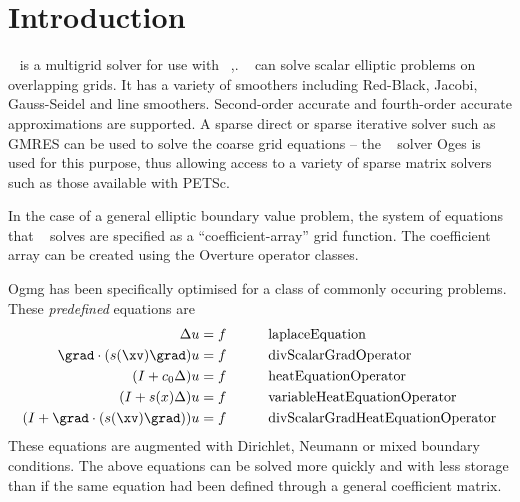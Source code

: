 \documentclass{article}
\begin{document}
\clearpage
\tableofcontents



\clearpage
\section{Introduction}

\Ogmg~ is a multigrid solver for use with \Overture~\cite{overset96},\cite{OGES}.
\Ogmg~ can solve scalar elliptic problems
on overlapping grids. It has a variety of smoothers including
Red-Black, Jacobi, Gauss-Seidel and line smoothers. Second-order accurate and fourth-order
accurate approximations are supported.
A sparse direct or sparse iterative
solver such as GMRES can be used to solve the coarse grid equations --
the \Overture~ solver Oges is used for this purpose, thus allowing access to a variety of
sparse matrix solvers such as those available with PETSc\cite{PETSc}.

In the case of a general elliptic boundary value problem, 
the system of equations that \Ogmg~ solves are specified as a ``coefficient-array''
grid function. The coefficient array can be created using the Overture operator classes. 


Ogmg has been specifically optimised for a class of commonly occuring problems. These
{\sl predefined} equations are 
\begin{alignat*}{3} \label{eq:predefined}
   \Delta u & = f &\qquad&  \mbox{laplaceEquation}  \\
   \grad\cdot( s(\xv) \grad) u & = f &\qquad&  \mbox{divScalarGradOperator} \\
   (I + c_0 \Delta) u & = f &\qquad&  \mbox{heatEquationOperator}  \\
  (I + s(x) \Delta) u & = f &\qquad&  \mbox{variableHeatEquationOperator}  \\
  (I + \grad\cdot( s(\xv) \grad)) u & = f &\qquad&  \mbox{divScalarGradHeatEquationOperator} 
\end{alignat*}
These equations are augmented with Dirichlet, Neumann or mixed boundary conditions.
The above equations can be solved more quickly and with less storage than if the same equation had been
defined through a general coefficient matrix.
\end{document}

